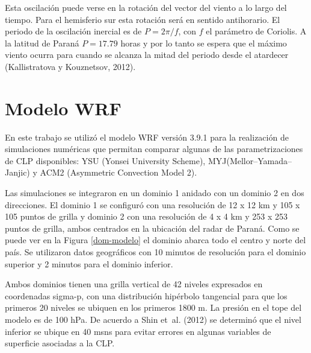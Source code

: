 \documentclass[12pt,spanish,oneside]{book}
\begin{document}
Esta oscilación puede verse en la rotación del vector del viento a lo
largo del tiempo. Para el hemisferio sur esta rotación será en sentido
antihorario. El periodo de la oscilación inercial es de \(P = 2\pi/f\),
con \(f\) el parámetro de Coriolis. A la latitud de Paraná \(P = 17.79\)
horas y por lo tanto se espera que el máximo viento ocurra para cuando
se alcanza la mitad del periodo desde el atardecer (Kallistratova y
Kouznetsov, 2012).

\section{Modelo WRF}\label{modelo-wrf}

En este trabajo se utilizó el modelo WRF versión 3.9.1 para la
realización de simulaciones numéricas que permitan comparar algunas de
las parametrizaciones de CLP disponibles: YSU (Yonsei University
Scheme), MYJ(Mellor--Yamada--Janjic) y ACM2 (Asymmetric Convection Model
2).

Las simulaciones se integraron en un dominio 1 anidado con un dominio 2
en dos direcciones. El dominio 1 se configuró con una resolución de 12 x
12 km y 105 x 105 puntos de grilla y dominio 2 con una resolución de 4 x
4 km y 253 x 253 puntos de grilla, ambos centrados en la ubicación del
radar de Paraná. Como se puede ver en la Figura \ref{dom-modelo} el
dominio abarca todo el centro y norte del país. Se utilizaron datos
geográficos con 10 minutos de resolución para el dominio superior y 2
minutos para el dominio inferior.

Ambos dominios tienen una grilla vertical de 42 niveles expresados en
coordenadas sigma-p, con una distribución hipérbolo tangencial para que
los primeros 20 niveles se ubiquen en los primeros 1800 m. La presión en
el tope del modelo es de 100 hPa. De acuerdo a Shin et~al. (2012) se
determinó que el nivel inferior se ubique en 40 msns para evitar errores
en algunas variables de superficie asociadas a la CLP.
\end{document}
